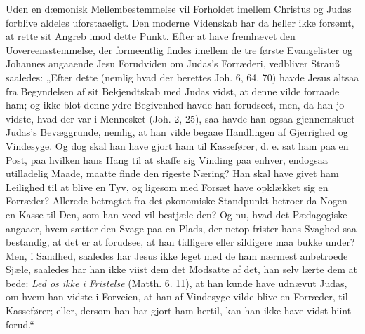 \documentclass[12pt,a4paper]{book}
\begin{document}
Uden en dæmonisk Mellembestemmelse vil Forholdet imellem Christus og Judas forblive
aldeles uforstaaeligt. Den moderne Videnskab har da heller ikke forsømt, at rette sit
Angreb imod dette Punkt. Efter at have fremhævet den Uovereensstemmelse, der formeentlig
findes imellem de tre første Evangelister og Johannes angaaende Jesu Forudviden om
Judas's Forræderi, vedbliver Strauß saaledes: „Efter dette (nemlig hvad der berettes
Joh. 6, 64. 70) havde Jesus altsaa fra Begyndelsen af sit Bekjendtskab med Judas vidst,
at denne vilde forraade ham; og ikke blot denne ydre Begivenhed havde han forudseet,
men, da han jo vidste, hvad der var i Mennesket (Joh. 2, 25), saa havde han ogsaa
gjennemskuet Judas's Bevæggrunde, nemlig, at han vilde
begaae Handlingen af Gjerrighed og Vindesyge. Og dog skal han have gjort ham til
Kassefører, d. e. sat ham paa en Post, paa hvilken hans Hang til at skaffe sig Vinding
paa enhver, endogsaa utilladelig Maade, maatte finde den rigeste Næring? Han skal have
givet ham Leilighed til at blive en Tyv, og ligesom med Forsæt have opklækket sig en
Forræder? Allerede betragtet fra det økonomiske Standpunkt betroer da Nogen en Kasse til
Den, som han veed vil bestjæle den? Og nu, hvad det Pædagogiske angaaer, hvem sætter den
Svage paa en Plads, der netop frister hans Svaghed saa bestandig, at det er at forudsee,
at han tidligere eller sildigere maa bukke under? Men, i Sandhed, saaledes har Jesus
ikke leget med de ham nærmest anbetroede Sjæle, saaledes har han ikke viist dem det
Modsatte af det, han selv lærte dem at bede: \emph{Led os ikke i Fristelse} (Matth. 6.
11), at han kunde have udnævut Judas, om hvem han vidste i Forveien, at han af Vindesyge
vilde blive en Forræder, til Kassefører; eller, dersom han har gjort ham hertil, kan han
ikke have vidst hiint forud.“
\end{document}
